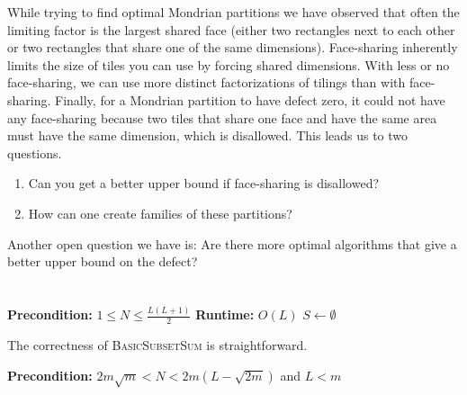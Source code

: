 \documentclass[11pt, reqno, psamsfonts]{amsart}
\theoremstyle{plain}
\theoremstyle{definition}
\theoremstyle{remark}
\begin{document}
While trying to find optimal Mondrian partitions we have observed that often the limiting factor is the largest shared face (either two rectangles next to each other or two rectangles that share one of the same dimensions). Face-sharing inherently limits the size of tiles you can use by forcing shared dimensions. With less or no face-sharing, we can use more distinct factorizations of tilings than with face-sharing. Finally, for a Mondrian partition to have defect zero, it could not have any face-sharing because two tiles that share one face and have the same area must have the same dimension, which is disallowed. This leads us to two questions. \begin{enumerate}
    \item Can you get a better upper bound if face-sharing is disallowed?
    \item How can one create families of these partitions?
\end{enumerate} 


Another open question we have is:
Are there more optimal algorithms that give a better upper bound on the defect?
\appendix
\section{}


\begin{algorithm}
\SetAlgoLined
{}
\DontPrintSemicolon
\textbf{Precondition:} $1 \leq N \leq \frac{L(L+1)}{2}$\;
\textbf{Runtime:} $O(L)$\;
$S \gets \emptyset$\;
\;
\caption{\textsc{BasicSubsetSum}}
\end{algorithm}

The correctness of \textsc{BasicSubsetSum} is straightforward.

\begin{algorithm}
\SetAlgoLined
{}
\DontPrintSemicolon
{}

\textbf{Precondition:} $2m\sqrt{m} < N < 2m(L - \sqrt{2m})$ and $L < m$\;

\caption{\textsc{RangeSubsetSum}}
\end{algorithm}
\end{document}
